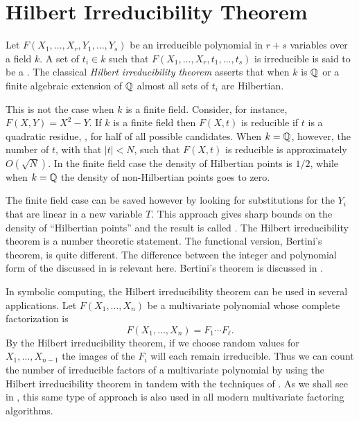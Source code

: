 \section{Hilbert Irreducibility Theorem}
\label{HIT:Sec}

Let $F(X_1, \ldots, X_r, Y_1, \ldots, Y_s)$ be an irreducible
polynomial in $r+s$ variables over a field $k$.  A set of $t_i \in k$
such that $F(X_1, \ldots, X_r, t_1, \ldots, t_s)$ is irreducible is said
to be a .  The classical {\em Hilbert
irreducibility theorem} asserts that when $k$ is $\mathbb{Q}$ or a finite
algebraic extension of $\mathbb{Q}$ almost all sets of $t_i$ are Hilbertian.

This is not the case when $k$ is a finite field.  Consider, for
instance, $F(X, Y) = X^2 - Y$.  If $k$ is a finite field then $F(X,
t)$ is reducible if $t$ is a quadratic residue, \ie, for half of all
possible candidates.  When $k = \mathbb{Q}$, however, the number of $t$, with 
that $|t| < N$, such that $F(X, t)$ is reducible is approximately
$O(\sqrt{N})$.  In the finite field case the density of Hilbertian
points is $1/2$, while when $k = \mathbb{Q}$ the density of non-Hilbertian
points goes to zero.

The finite field case can be saved however by looking for
substitutions for the $Y_i$ that are linear in a new variable $T$.
This approach gives sharp bounds on the density of ``Hilbertian
points'' and the result is called .  The
Hilbert irreducibility theorem is a number theoretic statement.  The
functional version, Bertini's theorem, is quite different.  The
difference between the integer and polynomial form of the {\ABCconj}
discussed in  is relevant here.  Bertini's theorem is
discussed in .

\medskip
In symbolic computing, the Hilbert irreducibility theorem can be used
in several applications.    Let $F(X_1, \ldots, X_n)$ be a multivariate
polynomial whose complete factorization is
\[
F(X_1, \ldots, X_n) = F_1 \cdots F_{\ell}.
\]
By the Hilbert irreducibility theorem, if we choose random values for
$X_1, \ldots, X_{n-1}$ the images of the $F_i$ will each remain
irreducible.  Thus we can count the number of irreducible factors of a
multivariate polynomial by using the Hilbert irreducibility theorem in
tandem with the techniques of .  As we shall
see in , this same type of approach is also
used in all modern multivariate factoring algorithms.

